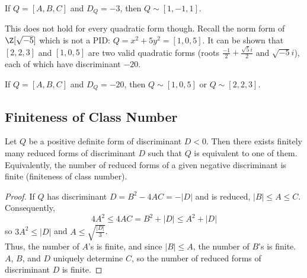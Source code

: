 \documentclass[11pt]{article}
\begin{document}
\begin{lemma}
If $Q = [A, B, C]$ and $D_{Q} = -3$, then $Q \sim [1, -1, 1]$.     
\end{lemma}

\begin{remark}
This does not hold for every quadratic form though. Recall the norm form of $\Z[\sqrt{-5}]$ which is not a PID: $Q = x^2 + 5y^2 = [1, 0, 5]$. It can be shown that $[2, 2, 3]$ and $[1, 0, 5]$ are two valid quadratic forms (roots $\frac{-1}{2} + \frac{\sqrt{5}i}{2}$ and $\sqrt{-5}i $), each of which have discriminant $-20$.
\end{remark}

\begin{lemma}
    If $Q = [A, B, C]$ and $D_{Q} = -20$, then $Q \sim [1, 0, 5]$ or $Q \sim [2, 2, 3]$.    
\end{lemma}

\subsection{Finiteness of Class Number}
\begin{theorem}[Gauss]
Let $Q$ be a positive definite form of discriminant $D < 0$. Then there exists finitely many reduced forms of discriminant $D$ such that $Q$ is equivalent to one of them. \\

Equivalently, the number of reduced forms of a given negative discriminant is finite (finiteness of class number).
\end{theorem}

\begin{proof}
If $Q$ has discriminant $D = B^2 - 4AC = -|D|$ and is reduced, $|B| \leq A \leq C$. \\

Consequently, 
\[
    4A^2 \leq 4AC = B^2 + |D| \leq A^2 + |D|
\]
so $3A^2 \leq |D|$ and $A \leq \sqrt{\frac{|D|}{3}}$. \\

Thus, the number of $A$'s is finite, and since $|B| \leq A$, the number of $B$'s is finite. $A$, $B$, and $D$ uniquely determine $C$, so the number of reduced forms of discriminant $D$ is finite.
\end{proof}
\end{document}
